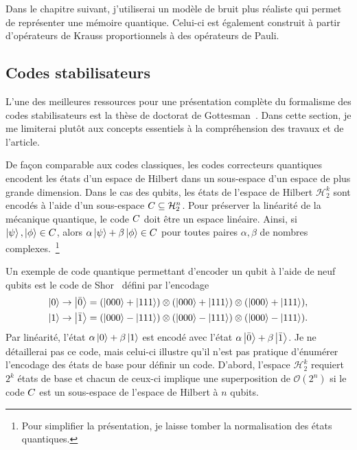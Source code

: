 Dans le chapitre suivant,
j'utiliserai un modèle de bruit plus réaliste qui permet
de représenter une mémoire quantique.
Celui-ci est également construit à partir d'opérateurs de Krauss proportionnels à des
opérateurs de Pauli.

\subsection{Codes stabilisateurs}
\label{sec:codes_stabs}

L'une des meilleures ressources pour une présentation complète du formalisme des codes
stabilisateurs est la thèse de doctorat de Gottesman~\cite{gottesman_stabilizer_1997}.
Dans cette section,
je me limiterai plutôt aux concepts essentiels à la compréhension des travaux et de l'article.

De façon comparable aux codes classiques,
les codes correcteurs quantiques encodent les états d'un espace de Hilbert
dans un sous-espace d'un espace de plus grande dimension.
Dans le cas des qubits,
les états de l'espace de Hilbert $\mathcal H_2^k$ sont encodés à l'aide d'un
sous-espace $C \subseteq \mathcal H_2^n$.
Pour préserver la linéarité de la mécanique quantique,
le code $C$ doit être un espace linéaire.
Ainsi,
si $\ket\psi, \ket\phi \in C$,
alors $\alpha\ket\psi + \beta\ket\phi \in C$ 
pour toutes paires $\alpha, \beta$ de nombres complexes.~\footnote{
  Pour simplifier la présentation,
  je laisse tomber la normalisation des états quantiques.
}

Un exemple de code quantique permettant d'encoder un qubit à l'aide de neuf qubits est 
le code de Shor~\cite{shor_scheme_1995} défini par l'encodage
\begin{align}
  \ket{0} \to \ket{\bar{0}} = (\ket{000} + \ket{111}) \otimes (\ket{000} + \ket{111}) \otimes (\ket{000} + \ket{111}), \notag \\
  \ket{1} \to \ket{\bar{1}} = (\ket{000} - \ket{111}) \otimes (\ket{000} - \ket{111}) \otimes (\ket{000} - \ket{111}).
  \label{eq:code_shor}
\end{align}
Par linéarité, l'état $\alpha \ket{0} + \beta \ket{1}$ est encodé avec l'état 
$\alpha \ket{\bar{0}} + \beta\ket{\bar {1}}$.
Je ne détaillerai pas ce code,
mais celui-ci illustre qu'il n'est pas pratique d'énumérer l'encodage des états de base
pour définir un code.
D'abord,
l'espace $\mathcal H_2^k$ requiert $2^k$ états de base
et chacun de ceux-ci implique une superposition de $\mathcal O(2^n)$ 
si le code $C$ est un sous-espace de l'espace de Hilbert à $n$ qubits.

